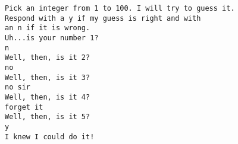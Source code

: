 \begin{frame}[fragile]\ft{\secname}
\begin{lstlisting}
Pick an integer from 1 to 100. I will try to guess it.
Respond with a y if my guess is right and with
an n if it is wrong.
Uh...is your number 1?
n
Well, then, is it 2?
no
Well, then, is it 3?
no sir
Well, then, is it 4?
forget it
Well, then, is it 5?
y
I knew I could do it!
\end{lstlisting}
\end{frame}








